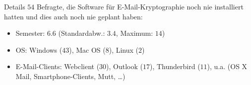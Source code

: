 \documentclass[]{beamer}
\begin{document}
\begin{frame}{Details}
	$54$ Befragte, die Software für E-Mail-Kryptographie noch nie installiert hatten und dies auch noch nie geplant haben:
	\begin{itemize}
		\item Semester: $6.6$ (Standardabw.: $3.4$, Maximum: $14$)
		\item OS: Windows ($43$), Mac OS ($8$), Linux ($2$)
		\item E-Mail-Clients: Webclient ($30$), Outlook ($17$), Thunderbird ($11$), u.a. (OS X Mail, Smartphone-Clients, Mutt, \ldots)
	\end{itemize}
\end{frame}
\end{document}
